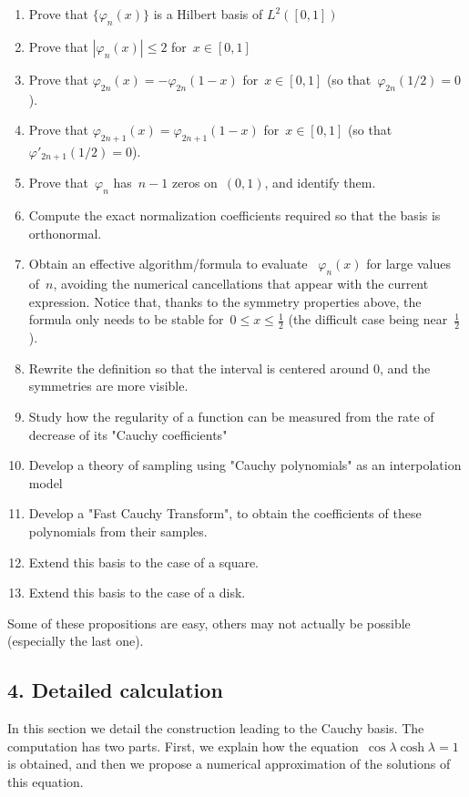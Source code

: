 \begin{enumerate}
	\item Prove that $\{\varphi_n(x)\}$ is a Hilbert basis of $L^2([0,1])$
	\item Prove that $|\varphi_n(x)|\le 2$ for~$x\in[0,1]$
	\item Prove that $\varphi_{2n}(x)=-\varphi_{2n}(1-x)$ for~$x\in[0,1]$
		(so that~$\varphi_{2n}(1/2)=0$).
	\item Prove that $\varphi_{2n+1}(x)=\varphi_{2n+1}(1-x)$ for~$x\in[0,1]$
		(so that~$\varphi'_{2n+1}(1/2)=0$).
	\item Prove that~$\varphi_n$ has~$n-1$ zeros on~$(0,1)$, and identify
		them.
	\item Compute the exact normalization coefficients required so that the
		basis is orthonormal.
	\item Obtain an effective algorithm/formula to evaluate
		~$\varphi_n(x)$ for large values of~$n$, avoiding the
		numerical cancellations that appear with the current
		expression.  Notice that, thanks to the symmetry properties
		above, the formula only needs to be stable for~$0\le
		x\le\frac{1}{2}$ (the difficult case being
		near~$\frac{1}{2}$).
	\item Rewrite the definition so that the interval is centered around
		0, and the symmetries are more visible.
	\item Study how the regularity of a function can be measured from the
		rate of decrease of its "Cauchy coefficients"
	\item Develop a theory of sampling using "Cauchy polynomials" as an
		interpolation model
	\item Develop a "Fast Cauchy Transform", to obtain the coefficients
		of these polynomials from their samples.
	\item Extend this basis to the case of a square.
	\item Extend this basis to the case of a disk.
\end{enumerate}

Some of these propositions are easy, others may not actually be possible
(especially the last one).

\subsection{4. Detailed calculation}

In this section we detail the construction leading to the Cauchy basis.
The computation has two parts.  First, we explain how the
equation~$\cos\lambda\cosh\lambda=1$ is obtained,
and then we propose a numerical approximation of the solutions of this
equation.


